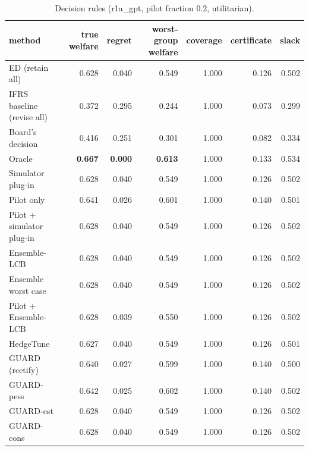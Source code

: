 \begin{table}[t]
\centering
\small
\begin{tabular}{lrrrrrr}
\toprule
method & true welfare & regret & worst-group welfare & coverage & certificate & slack \\
\midrule
ED (retain all) & 0.628 & 0.040 & 0.549 & 1.000 & 0.126 & 0.502 \\
IFRS baseline (revise all) & 0.372 & 0.295 & 0.244 & 1.000 & 0.073 & 0.299 \\
Board's decision & 0.416 & 0.251 & 0.301 & 1.000 & 0.082 & 0.334 \\
Oracle & \textbf{0.667} & \textbf{0.000} & \textbf{0.613} & 1.000 & 0.133 & 0.534 \\
Simulator plug-in & 0.628 & 0.040 & 0.549 & 1.000 & 0.126 & 0.502 \\
Pilot only & 0.641 & 0.026 & 0.601 & 1.000 & 0.140 & 0.501 \\
Pilot + simulator plug-in & 0.628 & 0.040 & 0.549 & 1.000 & 0.126 & 0.502 \\
Ensemble-LCB & 0.628 & 0.040 & 0.549 & 1.000 & 0.126 & 0.502 \\
Ensemble worst case & 0.628 & 0.040 & 0.549 & 1.000 & 0.126 & 0.502 \\
Pilot + Ensemble-LCB & 0.628 & 0.039 & 0.550 & 1.000 & 0.126 & 0.502 \\
HedgeTune & 0.627 & 0.040 & 0.549 & 1.000 & 0.126 & 0.501 \\
GUARD (rectify) & 0.640 & 0.027 & 0.599 & 1.000 & 0.140 & 0.500 \\
GUARD-pess & 0.642 & 0.025 & 0.602 & 1.000 & 0.140 & 0.502 \\
GUARD-est & 0.628 & 0.040 & 0.549 & 1.000 & 0.126 & 0.502 \\
GUARD-cons & 0.628 & 0.040 & 0.549 & 1.000 & 0.126 & 0.502 \\
\bottomrule
\end{tabular}
\caption{Decision rules (r1a\_gpt, pilot fraction 0.2, utilitarian).}
\label{tab:methods-utilitarian}
\end{table}
